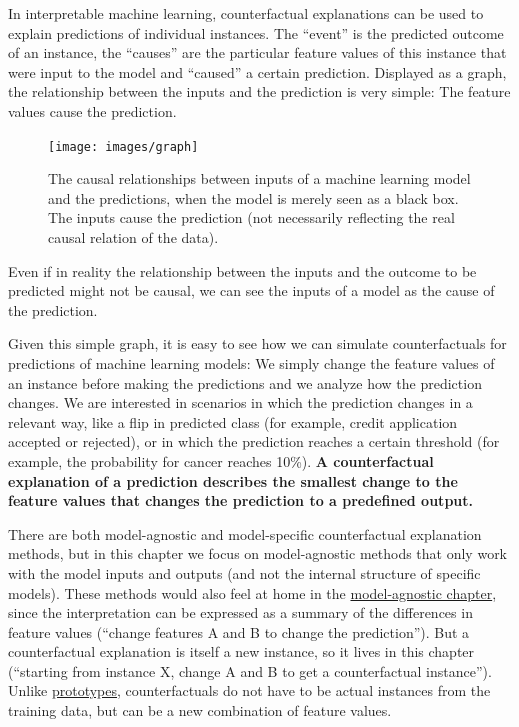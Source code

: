 \documentclass[
  11pt,
]{scrbook}
\begin{document}
In interpretable machine learning, counterfactual explanations can be used to explain predictions of individual instances.
The ``event'' is the predicted outcome of an instance, the ``causes'' are the particular feature values of this instance that were input to the model and ``caused'' a certain prediction.
Displayed as a graph, the relationship between the inputs and the prediction is very simple:
The feature values cause the prediction.

\begin{figure}

{\centering \texttt{[image: images/graph]} 

}

\caption{The causal relationships between inputs of a machine learning model and the predictions, when the model is merely seen as a black box. The inputs cause the prediction (not necessarily reflecting the real causal relation of the data).}\label{fig:ml-graph-cf}
\end{figure}

Even if in reality the relationship between the inputs and the outcome to be predicted might not be causal, we can see the inputs of a model as the cause of the prediction.

Given this simple graph, it is easy to see how we can simulate counterfactuals for predictions of machine learning models:
We simply change the feature values of an instance before making the predictions and we analyze how the prediction changes.
We are interested in scenarios in which the prediction changes in a relevant way, like a flip in predicted class (for example, credit application accepted or rejected), or in which the prediction reaches a certain threshold (for example, the probability for cancer reaches 10\%).
\textbf{A counterfactual explanation of a prediction describes the smallest change to the feature values that changes the prediction to a predefined output.}

There are both model-agnostic and model-specific counterfactual explanation methods, but in this chapter we focus on model-agnostic methods that only work with the model inputs and outputs (and not the internal structure of specific models).
These methods would also feel at home in the \protect\hyperlink{agnostic}{model-agnostic chapter}, since the interpretation can be expressed as a summary of the differences in feature values (``change features A and B to change the prediction'').
But a counterfactual explanation is itself a new instance, so it lives in this chapter (``starting from instance X, change A and B to get a counterfactual instance'').
Unlike \protect\hyperlink{proto}{prototypes}, counterfactuals do not have to be actual instances from the training data, but can be a new combination of feature values.
\end{document}
